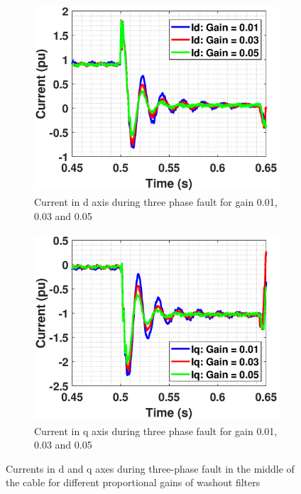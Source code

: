\begin{figure}[H]
\begin{subfigure}{0.5\textwidth}
  \includegraphics[height = 7cm,width = \textwidth]{Diagrams/Chapter_3/ID_Washout_Comp.eps}
  \caption{Current in d axis during three phase fault for gain 0.01, 0.03 and 0.05}
  \label{fig:ID_Washout_Comp}
\end{subfigure}%
\begin{subfigure}{0.5\textwidth}
  \includegraphics[height = 7cm,width = \textwidth]{Diagrams/Chapter_3/IQ_Washout_Comp.eps}
  \caption{Current in q axis during three phase fault for gain 0.01, 0.03 and 0.05}
  \label{fig:IQ_Washout_Comp}
\end{subfigure}
\caption{Currents in d and q axes during three-phase fault in the middle of the cable for different proportional gains of washout filters}
\label{fig:ID_IQ_Washout_Comp}
\end{figure}

